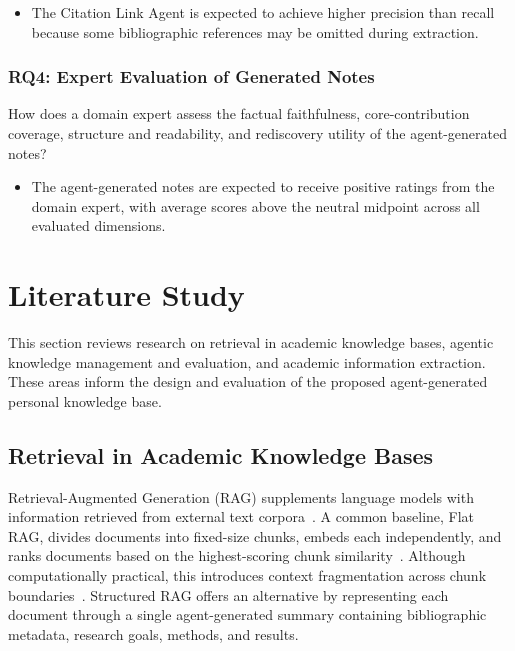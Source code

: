 \documentclass[runningheads]{llncs}
\begin{document}
\begin{itemize}
\item[\textbf{H3:}] The Citation Link Agent is expected to achieve
higher precision than recall because some bibliographic references may
be omitted during extraction.
\end{itemize}

\subsubsection{RQ4: Expert Evaluation of Generated Notes}

How does a domain expert assess the factual faithfulness, core-contribution coverage, structure and readability, and rediscovery utility of the agent-generated notes?

\begin{itemize}
\item[\textbf{H4:}] The agent-generated notes are expected to receive positive ratings from the domain expert, with average scores above the neutral midpoint across all evaluated dimensions.
\end{itemize}


\section{Literature Study}
\label{sec:literature}

This section reviews research on retrieval in academic knowledge bases, agentic knowledge management and evaluation, and academic information extraction. These areas inform the design and evaluation of the proposed agent-generated personal knowledge base.

\subsection{Retrieval in Academic Knowledge Bases}

Retrieval-Augmented Generation (RAG) supplements language models with information retrieved from external text corpora~\cite{lewis2020retrieval}. A common baseline, Flat RAG, divides documents into fixed-size chunks, embeds each independently, and ranks documents based on the highest-scoring chunk similarity~\cite{qiu2024personal}. Although computationally practical, this introduces context fragmentation across chunk boundaries~\cite{sarthi2024raptor}. Structured RAG offers an alternative by representing each document through a single agent-generated summary containing bibliographic metadata, research goals, methods, and results.
\end{document}
